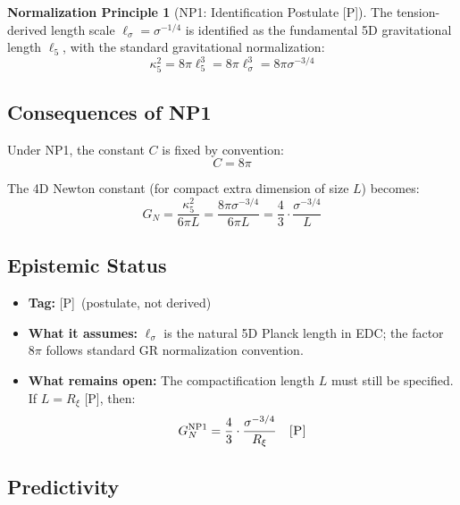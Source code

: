 \documentclass[11pt,a4paper]{article}
\theoremstyle{definition}
\newtheorem{principle}{Normalization Principle}
\newcommand{\Post}{\textsc{[P]}}
\begin{document}
\begin{principle}[NP1: Identification Postulate \Post]
\label{np1}
The tension-derived length scale $\ell_\sigma = \sigma^{-1/4}$ is identified
as the fundamental 5D gravitational length $\ell_5$, with the standard
gravitational normalization:
\begin{equation}
\kappa_5^2 = 8\pi \ell_5^3 = 8\pi \ell_\sigma^3 = 8\pi \sigma^{-3/4}
\label{eq:np1}
\end{equation}
\end{principle}

\subsection{Consequences of NP1}

Under NP1, the constant $C$ is fixed by convention:
\begin{equation}
\boxed{C = 8\pi}
\end{equation}

The 4D Newton constant (for compact extra dimension of size $L$) becomes:
\begin{equation}
G_N = \frac{\kappa_5^2}{6\pi L} = \frac{8\pi \sigma^{-3/4}}{6\pi L}
= \frac{4}{3} \cdot \frac{\sigma^{-3/4}}{L}
\label{eq:gn_np1}
\end{equation}

\subsection{Epistemic Status}

\begin{itemize}
\item \textbf{Tag:} \Post\ (postulate, not derived)
\item \textbf{What it assumes:} $\ell_\sigma$ is the natural 5D Planck length
in EDC; the factor $8\pi$ follows standard GR normalization convention.
\item \textbf{What remains open:} The compactification length $L$ must still
be specified. If $L = R_\xi$ \Post, then:
\begin{equation}
G_N^{\rm NP1} = \frac{4}{3} \cdot \frac{\sigma^{-3/4}}{R_\xi}
\quad \text{\Post}
\label{eq:gn_np1_rxi}
\end{equation}
\end{itemize}

\subsection{Predictivity}
\end{document}
